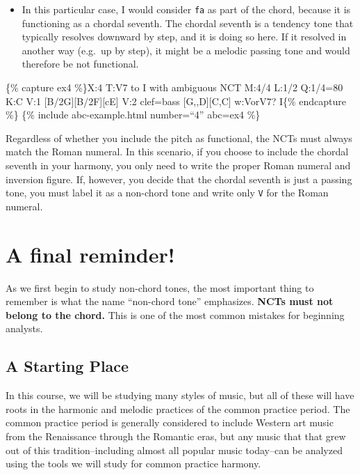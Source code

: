 \documentclass{book}
\providecommand{\tightlist}{%
  \setlength{\itemsep}{0pt}\setlength{\parskip}{0pt}}
\begin{document}
\begin{itemize}
\tightlist
\item
  In this particular case, I would consider \texttt{fa} as part of the chord,
  because it is functioning as a chordal seventh. The chordal seventh is a
  tendency tone that typically resolves downward by step, and it is doing so
  here. If it resolved in another way (e.g.~up by step), it might be a melodic
  passing tone and would therefore be not functional.
\end{itemize}

\{\% capture ex4 \%\}X:4 T:V7 to I with ambiguous NCT M:4/4 L:1/2 Q:1/4=80 K:C
V:1 {[}B/2G{]}{[}B/2F{]}{[}cE{]}\textbar{]} V:2 clef=bass
{[}G,,D{]}{[}C,C{]}\textbar{]} w:VorV7? I\{\% endcapture \%\} \{\% include
abc-example.html number=``4'' abc=ex4 \%\}

Regardless of whether you include the pitch as functional, the NCTs must
always match the Roman numeral. In this scenario, if you choose to include the
chordal seventh in your harmony, you only need to write the proper Roman
numeral and inversion figure. If, however, you decide that the chordal seventh
is just a passing tone, you must label it as a non-chord tone and write only
\texttt{V} for the Roman numeral.

\hypertarget{a-final-reminder}{%
\section{A final reminder!}\label{a-final-reminder}}

As we first begin to study non-chord tones, the most important thing to
remember is what the name ``non-chord tone'' emphasizes. \textbf{NCTs must not
belong to the chord.} This is one of the most common mistakes for beginning
analysts.

\hypertarget{a-starting-place}{%
\subsection{A Starting Place}\label{a-starting-place}}

In this course, we will be studying many styles of music, but all of these
will have roots in the harmonic and melodic practices of the common practice
period. The common practice period is generally considered to include Western
art music from the Renaissance through the Romantic eras, but any music that
that grew out of this tradition--including almost all popular music today--can
be analyzed using the tools we will study for common practice harmony.
\end{document}

